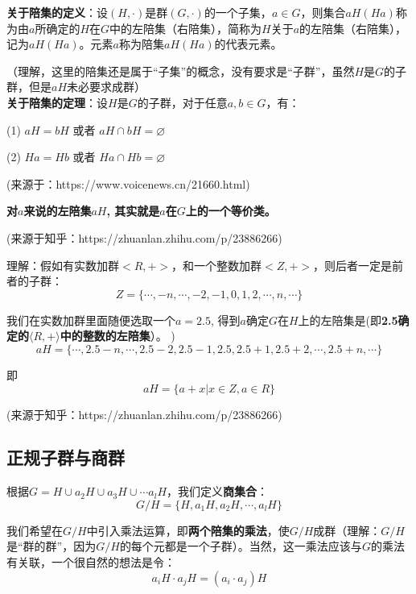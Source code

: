 \documentclass[12pt]{article}
\begin{document}
\begin{framed}
\textbf{关于陪集的定义}：设$(H,\cdot)$是群$(G,\cdot)$的一个子集，$a \in G$，则集合$aH(Ha)$称为由$a$所确定的$H$在$G$中的左陪集（右陪集），简称为$H$关于$a$的左陪集（右陪集），记为$aH(Ha)$。元素$a$称为陪集$aH(Ha)$的代表元素。

（理解，这里的陪集还是属于“子集”的概念，没有要求是“子群”，虽然$H$是$G$的子群，但是$aH$未必要求成群）
~\\

\textbf{关于陪集的定理}：设$H$是$G$的子群，对于任意$a, b \in G$，有：

(1) $aH = bH$ 或者 $aH \cap bH = \varnothing$

(2) $Ha = Hb$ 或者 $Ha \cap Hb = \varnothing$

(来源于：https://www.voicenews.cn/21660.html)

\textbf{对$a$来说的左陪集$aH$, 其实就是$a$在$G$上的一个等价类。}

(来源于知乎：https://zhuanlan.zhihu.com/p/23886266)
\end{framed}

\begin{framed}
\small{
理解：假如有实数加群$<R, +>$，和一个整数加群$<Z, +>$，则后者一定是前者的子群：
$$
Z = \{\cdots, -n, \cdots, -2, -1, 0, 1, 2, \cdots, n, \cdots \}
$$

我们在实数加群里面随便选取一个$a = 2.5$, 得到$a$确定$G$在$H$上的左陪集是(即\textbf{2.5确定的$\langle R, + \rangle$中的整数的左陪集}）。
)
$$
aH = \{\cdots, 2.5-n, \cdots, 2.5-2, 2.5-1, 2.5, 2.5+1, 2.5+2, \cdots, 2.5+n, \cdots \}
$$

即
$$
aH = \{a+x | x \in Z, a \in R\}
$$

(来源于知乎：https://zhuanlan.zhihu.com/p/23886266)
}
\end{framed}

\subsection{正规子群与商群}

根据$G = H \cup a_2H \cup a_3H \cup \cdots a_lH$，我们定义\textbf{商集合}：
$$
G/H = \{H, a_1H, a_2H, \cdots, a_lH\}
$$

我们希望在$G/H$中引入乘法运算，即\textbf{两个陪集的乘法}，使$G/H$成群（理解：$G/H$是“群的群”，因为$G/H$的每个元都是一个子群）。当然，这一乘法应该与$G$的乘法有关联，一个很自然的想法是令：
$$
a_iH \cdot a_jH = (a_i\cdot a_j)H
$$
\end{document}
